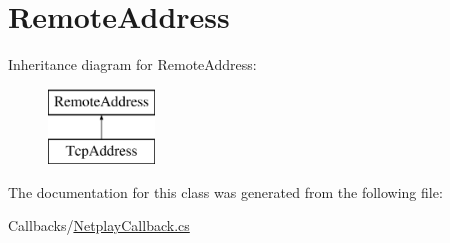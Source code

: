 \hypertarget{classOTA_1_1Callbacks_1_1RemoteAddress}{}\section{Remote\+Address}
\label{classOTA_1_1Callbacks_1_1RemoteAddress}
Inheritance diagram for Remote\+Address\+:\begin{figure}[H]
\begin{center}
\leavevmode
\includegraphics[height=2.000000cm]{classOTA_1_1Callbacks_1_1RemoteAddress}
\end{center}
\end{figure}


The documentation for this class was generated from the following file\+:\begin{DoxyCompactItemize}
\item 
Callbacks/\hyperlink{NetplayCallback_8cs}{Netplay\+Callback.\+cs}\end{DoxyCompactItemize}
